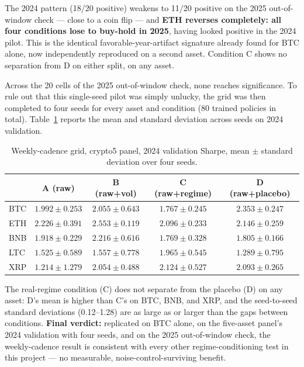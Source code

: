 The 2024 pattern (18/20 positive) weakens to 11/20 positive on the 2025 out-of-window check --- close to a coin flip --- and \textbf{ETH reverses completely: all four conditions lose to buy-hold in 2025}, having looked positive in the 2024 pilot. This is the identical favorable-year-artifact signature already found for BTC alone, now independently reproduced on a second asset. Condition C shows no separation from D on either split, on any asset.

Across the 20 cells of the 2025 out-of-window check, none reaches significance. To rule out that this single-seed pilot was simply unlucky, the grid was then completed to four seeds for every asset and condition (80 trained policies in total). Table~\ref{tab:rl-weekly-crypto5-4seed} reports the mean and standard deviation across seeds on 2024 validation.

\begin{table}[H]
\centering
\small
\caption{Weekly-cadence grid, crypto5 panel, 2024 validation Sharpe, mean $\pm$ standard deviation over four seeds.}
\label{tab:rl-weekly-crypto5-4seed}
\begin{tabular}{|l|c|c|c|c|}
\hline
 & \textbf{A (raw)} & \textbf{B (raw+vol)} & \textbf{C (raw+regime)} & \textbf{D (raw+placebo)} \\
\hline
BTC & $1.992 \pm 0.253$ & $2.055 \pm 0.643$ & $1.767 \pm 0.245$ & $2.353 \pm 0.247$ \\
\hline
ETH & $2.226 \pm 0.391$ & $2.553 \pm 0.119$ & $2.096 \pm 0.233$ & $2.146 \pm 0.259$ \\
\hline
BNB & $1.918 \pm 0.229$ & $2.216 \pm 0.616$ & $1.769 \pm 0.328$ & $1.805 \pm 0.166$ \\
\hline
LTC & $1.525 \pm 0.589$ & $1.557 \pm 0.778$ & $1.965 \pm 0.545$ & $1.289 \pm 0.795$ \\
\hline
XRP & $1.214 \pm 1.279$ & $2.054 \pm 0.488$ & $2.124 \pm 0.527$ & $2.093 \pm 0.265$ \\
\hline
\end{tabular}
\normalsize
\end{table}

The real-regime condition (C) does not separate from the placebo (D) on any asset: D's mean is higher than C's on BTC, BNB, and XRP, and the seed-to-seed standard deviations (0.12--1.28) are as large as or larger than the gaps between conditions. \textbf{Final verdict:} replicated on BTC alone, on the five-asset panel's 2024 validation with four seeds, and on the 2025 out-of-window check, the weekly-cadence result is consistent with every other regime-conditioning test in this project --- no measurable, noise-control-surviving benefit.
